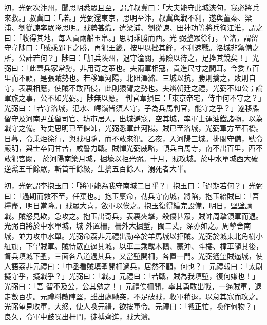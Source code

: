 \begin{pinyinscope}
 初，光弼次汴州，聞思明悉眾且至，謂許叔冀曰：「大夫能守此城浹旬，我必將兵來救。」叔冀曰：「諾。」光弼還東京，思明至汴，叔冀與戰不利，遂與董秦、梁浦、劉從諫率眾降思明。賊勢甚熾，遣梁浦、劉從諫、田神功等將兵徇江淮，謂之曰：「收得其地，每人貢兩船玉帛。」思明乘勝而西。光
 弼整眾徐行，至洛，謂留守韋陟曰：「賊乘鄴下之勝，再犯王畿，按甲以挫其鋒，不利速戰。洛城非禦備之所，公計若何？」陟曰：「加兵陜州，退守潼關，據險以待之，足挫其銳矣！」光弼曰：「此蓋兵家常勢，非用奇之策也。夫兩軍相寇，貴進尺寸之間耳。今委五百里而不顧，是張賊勢也。若移軍河陽，北阻澤潞、三城以抗，勝則擒之，敗則自守，表裏相應，使賊不敢西侵，此則猿臂之勢也。夫辨朝廷之禮，光弼不如公；論軍旅之事，公不如光弼。」陟無以應。
 判官韋損曰：「東京帝宅，侍中何不守之？」光弼曰：「若守洛城，汜水、崿嶺皆須人守，子為兵馬判官，能守之乎？」遂移牒留守及河南尹並留司官、坊市居人，出城避寇，空其城，率軍士運油鐵諸物，以為戰守之備。時史思明已至偃師，光弼悉軍赴河陽。賊已至洛城，光弼軍方至石橋。日暮，令秉炬徐行，與賊相隨，而不敢來犯。乙夜，入河陽三城。排閱守備，號令嚴明，與士卒同甘苦，咸誓力戰。賊憚光弼威略，頓兵白馬寺，南不出百里，西不敢犯宮闕，
 於河陽南築月城，掘壕以拒光弼。十月，賊攻城。於中水單城西大破逆黨五千餘眾，斬首千餘級，生擒五百餘人，溺死者大半。



 初，光弼謂李抱玉曰：「將軍能為我守南城二日乎？」抱玉曰：「過期若何？」光弼曰：「過期而救不至，任棄也。」抱玉稟命，勒兵守南城，將陷，抱玉紿賊曰：「吾糧盡，明日當降。」賊眾大喜，斂軍以俟之。抱玉復得繕完設備，明日，堅壁請戰。賊怒見欺，急攻之。抱玉出奇兵，表裏夾擊，殺傷甚眾，賊帥周摯領軍而退。光弼自將於中水單城，城
 外置柵，柵外大掘塹，闊二丈，深亦如之。周摯舍南城，並力攻中水單。光弼命荔非元禮出勁卒於羊馬城以拒賊。光弼於城東北角樹小紅旗，下望賊軍。賊恃眾直逼其城，以車二乘載木鵝、蒙沖、斗樓、橦車隨其後，督兵填城下塹，三面各八道過其兵，又當塹開柵，各置一門。光弼遙望賊逼城，使人語荔非元禮曰：「中丞看賊填塹開柵過兵，居然不顧，何也？」元禮報曰：「太尉擬守乎，擬戰乎？」光弼曰：「戰。」元禮曰：「若戰，賊為我填塹，復何嫌也！」光弼曰：「吾
 智不及公，公其勉之！」元禮俟柵開，率其勇敢出戰，一逼賊軍，退走數百步。元禮料敵陣堅，雖出處馳突，不足破賊，收軍稍退，以怠其寇而攻之。光弼望見收軍，大怒，使人喚元禮，欲按軍令。元禮曰：「戰正忙，喚作何物？」良久，令軍中鼓噪出柵門，徒搏齊進，賊大潰。




\end{pinyinscope}
